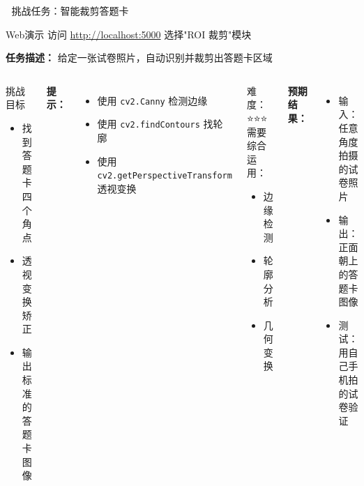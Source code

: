 \begin{frame}{🎯 挑战任务：智能裁剪答题卡}
	\begin{alertblock}{Web演示}
		访问 \url{http://localhost:5000} 选择"ROI 裁剪"模块
	\end{alertblock}

	\textbf{任务描述：} 给定一张试卷照片，自动识别并裁剪出答题卡区域

	\begin{columns}
		\begin{block}{挑战目标}
			\begin{itemize}
				\item 找到答题卡四个角点
				\item 透视变换矫正
				\item 输出标准的答题卡图像
			\end{itemize}
		\end{block}

		\vspace{0.3cm}
		\textbf{提示：}
		\begin{itemize}
			\item 使用 \texttt{cv2.Canny} 检测边缘
			\item 使用 \texttt{cv2.findContours} 找轮廓
			\item 使用 \texttt{cv2.getPerspectiveTransform} 透视变换
		\end{itemize}

		\begin{alertblock}{难度：⭐⭐⭐}
			需要综合运用：
			\begin{itemize}
				\item 边缘检测
				\item 轮廓分析
				\item 几何变换
			\end{itemize}
		\end{alertblock}

		\vspace{0.3cm}
		\textbf{预期结果：}
		\begin{itemize}
			\item 输入：任意角度拍摄的试卷照片
			\item 输出：正面朝上的答题卡图像
			\item 测试：用自己手机拍的试卷验证
		\end{itemize}
	\end{columns}
\end{frame}

